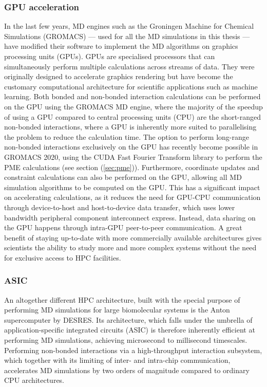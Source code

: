 \subsubsection{GPU acceleration}
In the last few years, MD engines such as the Groningen Machine for Chemical Simulations (GROMACS) --- used for all the MD simulations in this thesis --- have modified their software to implement the MD algorithms on graphics processing units (GPUs). GPUs are specialised processors that can simultaneously perform multiple calculations across streams of data. They were originally designed to accelerate graphics rendering but have become the customary computational architecture for scientific applications such as machine learning. Both bonded and non-bonded interaction calculations can be performed on the GPU using the GROMACS MD engine, where the majority of the speedup of using a GPU compared to central processing units (CPU) are the short-ranged non-bonded interactions, where a GPU is inherently more suited to parallelising the problem to reduce the calculation time. The option to perform long-range non-bonded interactions exclusively on the GPU has recently become possible in GROMACS 2020, using the CUDA Fast Fourier Transform library to perform the PME calculations (see section (\ref{sec:pme})). Furthermore, coordinate updates and constraint calculations can also be performed on the GPU, allowing all MD simulation algorithms to be computed on the GPU. This has a significant impact on accelerating calculations, as it reduces the need for GPU-CPU communication through device-to-host and host-to-device data transfer, which uses lower bandwidth peripheral component interconnect express. Instead, data sharing on the GPU happens through intra-GPU peer-to-peer communication.\cite{gromacs2020} A great benefit of staying up-to-date with more commercially available architectures gives scientists the ability to study more and more complex systems without the need for exclusive access to HPC facilities. 

\subsubsection{ASIC}
An altogether different HPC architecture, built with the special purpose of performing MD simulations for large biomolecular systems is the Anton supercomputer by DESRES.\cite{Shaw2008} Its architecture, which falls under the umbrella of application-specific integrated circuits (ASIC) is therefore inherently efficient at performing MD simulations, achieving microsecond to millisecond timescales. Performing non-bonded interactions via a high-throughput interaction subsystem, which together with its limiting of inter- and intra-chip communication, accelerates MD simulations by two orders of magnitude compared to ordinary CPU architectures.\cite{shaw2009millisecond}

